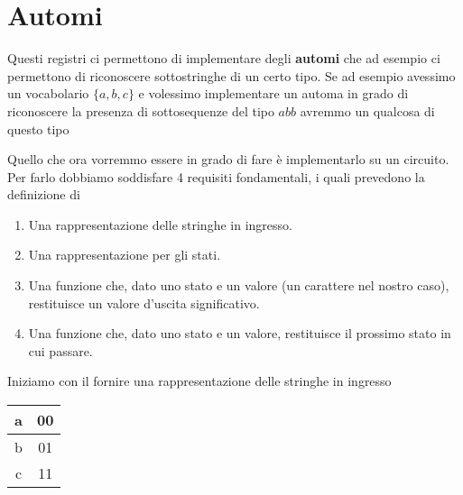 \section{Automi}
Questi registri ci permettono di implementare degli \textbf{automi} che ad esempio ci permettono
di riconoscere sottostringhe di un certo tipo. Se ad esempio avessimo un vocabolario $\{a, b, c\}$
e volessimo implementare un automa in grado di riconoscere la presenza di sottosequenze del tipo
$abb$ avremmo un qualcosa di questo tipo
\begin{center}
\end{center}
Quello che ora vorremmo essere in grado di fare è implementarlo su un circuito. Per farlo dobbiamo
soddisfare 4 requisiti fondamentali, i quali prevedono la definizione di
\begin{enumerate}
	\item Una rappresentazione delle stringhe in ingresso.
	\item Una rappresentazione per gli stati.
	\item Una funzione che, dato uno stato e un valore (un carattere nel nostro caso), restituisce
	      un valore d'uscita significativo.
	\item Una funzione che, dato uno stato e un valore, restituisce il prossimo stato in cui
	      passare.
\end{enumerate}
Iniziamo con il fornire una rappresentazione delle stringhe in ingresso
\begin{center}
	\begin{tabular}{c | c}
		a & 00 \\ \hline
		b & 01 \\ \hline
		c & 11
	\end{tabular}
\end{center}
